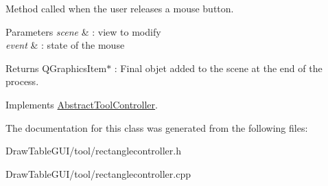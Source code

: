 Method called when the user releases a mouse button. 


\begin{DoxyParams}{Parameters}
{\em scene} & \+: view to modify \\
\hline
{\em event} & \+: state of the mouse\\
\hline
\end{DoxyParams}
\begin{DoxyReturn}{Returns}
Q\+Graphics\+Item$\ast$ \+: Final objet added to the scene at the end of the process. 
\end{DoxyReturn}


Implements \hyperlink{classAbstractToolController_a8815614e51c7c47d3234f4ce3d8384ea}{Abstract\+Tool\+Controller}.



The documentation for this class was generated from the following files\+:\begin{DoxyCompactItemize}
\item 
Draw\+Table\+G\+U\+I/tool/rectanglecontroller.\+h\item 
Draw\+Table\+G\+U\+I/tool/rectanglecontroller.\+cpp\end{DoxyCompactItemize}
